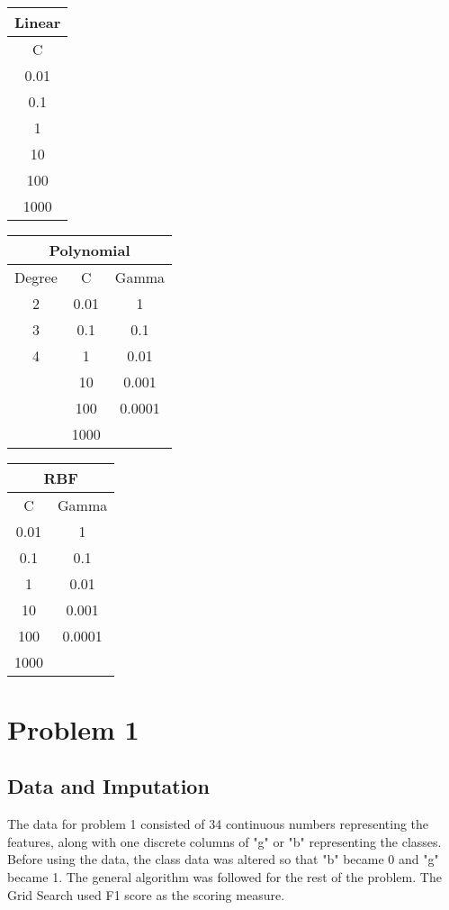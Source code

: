 \documentclass[12pt]{article}
\begin{document}
    \paragraph{}
    \begin{center}
    \begin{tabular}{| c |}
    	\hline Linear \\ \hline
    	C \\ \hline
    	0.01 \\
    	0.1 \\
        1 \\
        10 \\
        100 \\
    	1000 \\ \hline
    \end{tabular}
    \quad
    \begin{tabular}{| c | c | c |}
    	\hline
    	\multicolumn{3}{|c|}{Polynomial} \\ \hline
    	Degree & C & Gamma \\ \hline
    	2 & 0.01 & 1 \\
    	3 & 0.1 & 0.1 \\
    	4 & 1 & 0.01 \\
    	  & 10 & 0.001 \\
    	  & 100 & 0.0001 \\
    	  & 1000 & \\ \hline
    \end{tabular}
    \quad
    \begin{tabular}{| c | c |}
    	\hline
    	\multicolumn{2}{|c|}{RBF} \\ \hline
    	C & Gamma \\ \hline
    	0.01 & 1 \\
    	0.1 & 0.1 \\
    	1 & 0.01 \\
    	10 & 0.001 \\
    	100 & 0.0001 \\
    	1000 & \\ \hline
    \end{tabular}
    \end{center}

    \section{Problem 1}
    
    \subsection{Data and Imputation}
    The data for problem 1 consisted of 34 continuous numbers representing the features, along with one discrete columns of "g" or "b" representing the classes. Before using the data, the class data was altered so that "b" became 0 and "g" became 1. The general algorithm was followed for the rest of the problem. The Grid Search used F1 score as the scoring measure.
    
\end{document}
